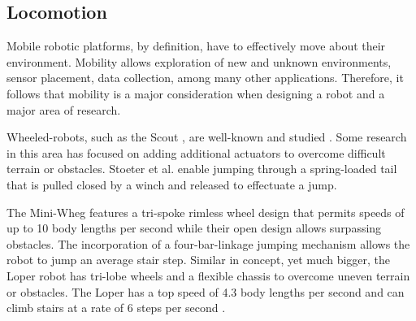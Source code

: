 		
	
	\subsection{Locomotion}%
	\label{sec:locomotion} 

		Mobile robotic platforms, by definition, have to effectively move about their environment. Mobility allows exploration of new and unknown environments, sensor placement, data collection, among many other applications. Therefore, it follows that mobility is a major consideration when designing a robot and a major area of research. 

		Wheeled-robots, such as the Scout \cite{Rybski2000}, are well-known and studied \cite{Soetanto2003}. Some research in this area has focused on adding additional actuators to overcome difficult terrain or obstacles. Stoeter et al. \cite{Stoeter2006} enable jumping through a spring-loaded tail that is pulled closed by a winch and released to effectuate a jump. %

		The Mini-Wheg \cite{Morrey2003} features a tri-spoke rimless wheel design that permits speeds of up to 10 body lengths per second while their open design allows surpassing obstacles. The incorporation of a four-bar-linkage jumping mechanism allows the robot to jump an average stair step. Similar in concept, yet much bigger, the Loper robot \cite{Herbert2008} has tri-lobe wheels and a flexible chassis to overcome uneven terrain or obstacles. The Loper has a top speed of 4.3 body lengths per second and can climb stairs at a rate of 6 steps per second \cite{Herbert2009}.  


